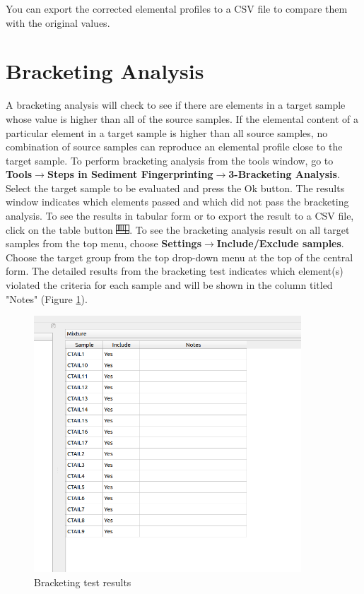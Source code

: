 \documentclass[12pt]{report}
\begin{document}
\FloatBarrier
You can export the corrected elemental profiles to a CSV file to compare them with the original values. 

\section{Bracketing Analysis}

A bracketing analysis will check to see if there are elements in a target sample whose value is higher than all of the source samples. If the elemental content of a particular element in a target sample is higher than all source samples, no combination of source samples can reproduce an elemental profile close to the target sample. To perform bracketing analysis from the tools window, go to \textbf{Tools}$\rightarrow$\textbf{Steps in Sediment Fingerprinting}$\rightarrow$\textbf{3-Bracketing Analysis}. Select the target sample to be evaluated and press the Ok button. The results window indicates which elements passed and which did not pass the bracketing analysis. To see the results in tabular form or to export the result to a CSV file, click on the table button \includegraphics[width=0.5cm]{Figures/table.png}. 
To see the bracketing analysis result on all target samples from the top menu, choose \textbf{Settings}$\rightarrow$\textbf{Include/Exclude samples}. Choose the target group from the top drop-down menu at the top of the central form. The detailed results from the bracketing test indicates which element(s) violated the criteria for each sample and will be shown in the column titled "Notes" (Figure \ref{fig:bracketing_results}). 

\begin{figure}[ht]
    \centering
    \includegraphics[width=10cm]{Figures/Bracketing.png}
    \caption{Bracketing test results}
    \label{fig:bracketing_results}
\end{figure}
\FloatBarrier
\end{document}

